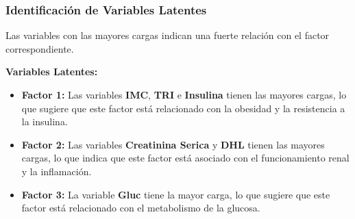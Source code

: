 \documentclass[
	11pt, %
]{beamer}
\begin{document}
\begin{frame}
\frametitle{Identificación de Variables Latentes}

Las variables con las mayores cargas indican una fuerte relación con el factor correspondiente.

\vspace{0.4cm}

\textbf{Variables Latentes:}

\begin{itemize}
    \item \textbf{Factor 1:} Las variables \textbf{IMC}, \textbf{TRI} e \textbf{Insulina} tienen las mayores cargas, lo que sugiere que este factor está relacionado con la obesidad y la resistencia a la insulina.
    \item \textbf{Factor 2:} Las variables \textbf{Creatinina Serica} y \textbf{DHL} tienen las mayores cargas, lo que indica que este factor está asociado con el funcionamiento renal y la inflamación.
    \item \textbf{Factor 3:} La variable \textbf{Gluc} tiene la mayor carga, lo que sugiere que este factor está relacionado con el metabolismo de la glucosa.
\end{itemize}

\end{frame}
\end{document}

